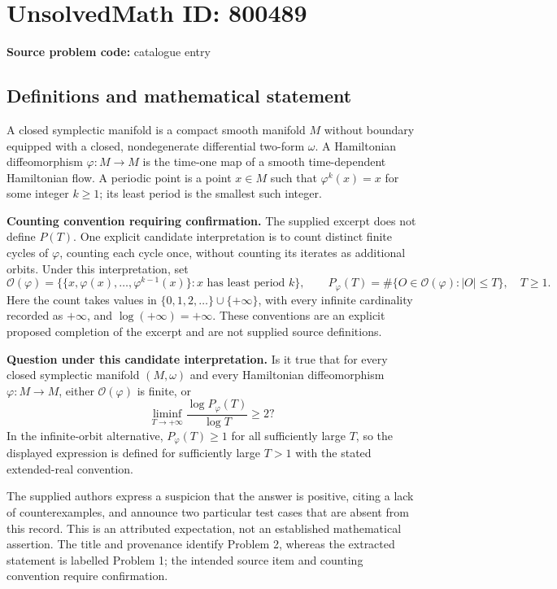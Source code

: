\documentclass[11pt]{article}
\begin{document}
\section*{UnsolvedMath ID: 800489}
\textbf{Source problem code:} catalogue entry
\subsection{Definitions and mathematical statement}
A closed symplectic manifold is a compact smooth manifold \(M\) without boundary equipped with a closed, nondegenerate differential two-form \(\omega\). A Hamiltonian diffeomorphism \(\varphi\colon M\to M\) is the time-one map of a smooth time-dependent Hamiltonian flow. A periodic point is a point \(x\in M\) such that \(\varphi^k(x)=x\) for some integer \(k\geq 1\); its least period is the smallest such integer.

\textbf{Counting convention requiring confirmation.} The supplied excerpt does not define \(P(T)\). One explicit candidate interpretation is to count distinct finite cycles of \(\varphi\), counting each cycle once, without counting its iterates as additional orbits. Under this interpretation, set
\[
\mathcal O(\varphi)=\bigl\{\{x,\varphi(x),\ldots,\varphi^{k-1}(x)\}:x\text{ has least period }k\bigr\},
\qquad
P_\varphi(T)=\#\{O\in\mathcal O(\varphi):|O|\leq T\},\quad T\geq 1.
\]
Here the count takes values in \(\{0,1,2,\ldots\}\cup\{+\infty\}\), with every infinite cardinality recorded as \(+\infty\), and \(\log(+\infty)=+\infty\). These conventions are an explicit proposed completion of the excerpt and are not supplied source definitions.

\textbf{Question under this candidate interpretation.} Is it true that for every closed symplectic manifold \((M,\omega)\) and every Hamiltonian diffeomorphism \(\varphi\colon M\to M\), either \(\mathcal O(\varphi)\) is finite, or
\[
\liminf_{T\to+\infty}\frac{\log P_\varphi(T)}{\log T}\geq 2?
\]
In the infinite-orbit alternative, \(P_\varphi(T)\geq 1\) for all sufficiently large \(T\), so the displayed expression is defined for sufficiently large \(T>1\) with the stated extended-real convention.

The supplied authors express a suspicion that the answer is positive, citing a lack of counterexamples, and announce two particular test cases that are absent from this record. This is an attributed expectation, not an established mathematical assertion. The title and provenance identify Problem 2, whereas the extracted statement is labelled Problem 1; the intended source item and counting convention require confirmation.
\end{document}
